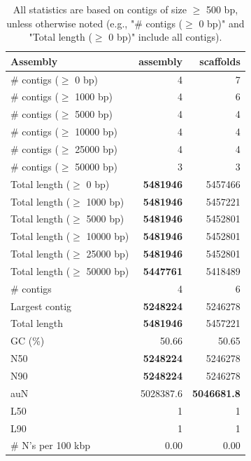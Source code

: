 \documentclass[12pt,a4paper]{article}
\begin{document}
\begin{table}[ht]
\begin{center}
\caption{All statistics are based on contigs of size $\geq$ 500 bp, unless otherwise noted (e.g., "\# contigs ($\geq$ 0 bp)" and "Total length ($\geq$ 0 bp)" include all contigs).}
\begin{tabular}{|l*{2}{|r}|}
\hline
Assembly & assembly & scaffolds \\ \hline
\# contigs ($\geq$ 0 bp) & 4 & 7 \\ \hline
\# contigs ($\geq$ 1000 bp) & 4 & 6 \\ \hline
\# contigs ($\geq$ 5000 bp) & 4 & 4 \\ \hline
\# contigs ($\geq$ 10000 bp) & 4 & 4 \\ \hline
\# contigs ($\geq$ 25000 bp) & 4 & 4 \\ \hline
\# contigs ($\geq$ 50000 bp) & 3 & 3 \\ \hline
Total length ($\geq$ 0 bp) & {\bf 5481946} & 5457466 \\ \hline
Total length ($\geq$ 1000 bp) & {\bf 5481946} & 5457221 \\ \hline
Total length ($\geq$ 5000 bp) & {\bf 5481946} & 5452801 \\ \hline
Total length ($\geq$ 10000 bp) & {\bf 5481946} & 5452801 \\ \hline
Total length ($\geq$ 25000 bp) & {\bf 5481946} & 5452801 \\ \hline
Total length ($\geq$ 50000 bp) & {\bf 5447761} & 5418489 \\ \hline
\# contigs & 4 & 6 \\ \hline
Largest contig & {\bf 5248224} & 5246278 \\ \hline
Total length & {\bf 5481946} & 5457221 \\ \hline
GC (\%) & 50.66 & 50.65 \\ \hline
N50 & {\bf 5248224} & 5246278 \\ \hline
N90 & {\bf 5248224} & 5246278 \\ \hline
auN & 5028387.6 & {\bf 5046681.8} \\ \hline
L50 & 1 & 1 \\ \hline
L90 & 1 & 1 \\ \hline
\# N's per 100 kbp & 0.00 & 0.00 \\ \hline
\end{tabular}
\end{center}
\end{table}
\end{document}
